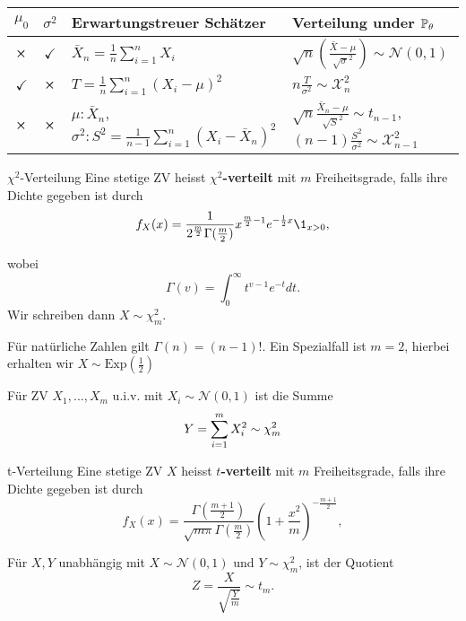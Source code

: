 \renewcommand\arraystretch{1.8}
\begin{center}
    \begin{tabular}{c|c|p{4cm}|p{2.75cm}}
  		$\mu_0$ & $\sigma^2$ & Erwartungstreuer Schätzer & Verteilung under $\mathbb{P}_\theta$ \\
  		\hline
  		\hline
  		$\cross$ & $\checkmark$ & $\bar X_n = \frac{1}{n} \sum_{i=1}^n X_i$ & $\sqrt n (\frac{\bar X - \mu}{\sqrt \sigma^2}) \sim \mathcal{N}(0,1) $ \\
  		\hline
  		$\checkmark$ & $\cross$ & $T = \frac{1}{n} \sum_{i=1}^n (X_i - \mu)^2$ & $n \frac{T}{\sigma^2} \sim \mathcal{X}_n^2$ \\
  		\hline
  		$\cross$ & $\cross$ & $\mu: \bar X_n$, \medskip \newline $\sigma^2 : S^2 = \frac{1}{n-1} \sum_{i=1}^n(X_i - \bar X_n)^2$ & $ \sqrt n \frac{\bar X_n - \mu}{\sqrt S^2} \sim t_{n-1}$, \smallskip \newline $(n-1) \frac{S^2}{\sigma^2} \sim \mathcal{X}_{n-1}^2$ 
	\end{tabular}
\end{center}
\renewcommand{\arraystretch}{1}


\begin{mainbox}{{$\chi^2$-Verteilung}}
Eine stetige ZV heisst \textbf{$\chi^2$-verteilt} mit $m$ Freiheitsgrade, falls ihre Dichte gegeben ist durch
$$f_X(x) = \frac{1}{2^{\frac{m}{2}} \Gamma (\frac{m}{2})} x^{\frac{m}{2}-1} e^{-\frac{1}{2}x} \1_{x > 0},$$
\end{mainbox}
wobei 
$$\Gamma(v) = \int_0^\infty t^{v-1} e^{-t} dt.$$
Wir schreiben dann $X \sim \chi^2_m$.

Für natürliche Zahlen gilt $\Gamma(n) = (n-1)!$. Ein Spezialfall ist $m = 2$, hierbei erhalten wir $X \sim \text{Exp}(\frac{1}{2})$ \medskip

\begin{subbox}{} Für ZV $X_1, ..., X_m$ u.i.v. mit $X_i \sim \mathcal{N}(0,1)$ ist die Summe 
$$Y = \sum\limits_{i=1}^m X_i^2 \sim \chi_m^2$$
\end{subbox}
\begin{mainbox}{t-Verteilung}
Eine stetige ZV $X$ heisst \textbf{$t$-verteilt} mit $m$ Freiheitsgrade, falls ihre Dichte gegeben ist durch 
$$f_X(x) = \frac{\Gamma (\frac{m+1}{2})}{\sqrt{m \pi} \Gamma (\frac{m}{2})} \left( 1 + \frac{x^2}{m} \right)^{-\frac{m+1}{2}},$$
\end{mainbox}
\begin{subbox}{} Für $X, Y$ unabhängig mit $X \sim \mathcal{N}(0,1)$ und $Y \sim \chi^2_m$, ist der Quotient
$$Z = \frac{X}{\sqrt{\frac{Y}{m}}} \sim t_m.$$\end{subbox}


